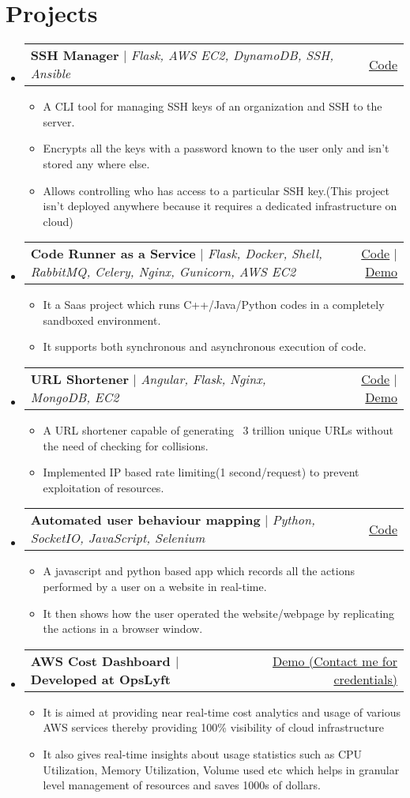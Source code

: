 \documentclass[letterpaper,11pt]{article}
\makeatletter
\newcommand{\resumeItem}[1]{
  \item\small{
    {#1 \vspace{-2pt}}
  }
}
\newcommand{\resumeProjectHeading}[2]{
    \item
    \begin{tabular*}{0.97\textwidth}{l@{\extracolsep{\fill}}r}
      \small#1 & #2 \\
    \end{tabular*}\vspace{-7pt}
}
\newcommand{\resumeSubHeadingListStart}{\begin{itemize}[leftmargin=0.15in, label={}]}
\newcommand{\resumeSubHeadingListEnd}{\end{itemize}}
\newcommand{\resumeItemListStart}{\begin{itemize}}
\newcommand{\resumeItemListEnd}{\end{itemize}\vspace{-5pt}}
\makeatother
\begin{document}
\section{Projects}
    \resumeSubHeadingListStart
      \resumeProjectHeading
          {\textbf{SSH Manager} $|$ \emph{Flask, AWS EC2, DynamoDB, SSH, Ansible}}{\href{https://github.com/kartikbehl99/ssh-manager-backend}{Code}}
          \resumeItemListStart
            \resumeItem{A CLI tool for managing SSH keys of an organization and SSH to the server.}
            \resumeItem{Encrypts all the keys with a password known to the user only and isn’t stored any where else.}
            \resumeItem{Allows controlling who has access to a particular SSH key.(This project isn't deployed anywhere because it requires a dedicated infrastructure on cloud)}
          \resumeItemListEnd
      \resumeProjectHeading
          {\textbf{Code Runner as a Service} $|$ \emph{Flask, Docker, Shell, RabbitMQ, Celery, Nginx, Gunicorn, AWS EC2}}{\href{https://github.com/thephilomaths/code-runner-as-a-service}{Code} $|$ \href{https://www.postman.com/kartikbehl99/workspace/code-runner-workspace/overview}{Demo}}
          \resumeItemListStart
            \resumeItem{It a Saas project which runs C++/Java/Python codes in a completely sandboxed environment.}
            \resumeItem{It supports both synchronous and asynchronous execution of code.}
         \resumeItemListEnd
      \resumeProjectHeading
          {\textbf{URL Shortener} $|$ \emph{Angular, Flask, Nginx, MongoDB, EC2}}{\href{https://github.com/kartikbehl99/URL-shortener-public}{Code} $|$ \href{https://smol.ga}{Demo}}
          \resumeItemListStart
            \resumeItem{A URL shortener capable of generating ~3 trillion unique URLs without the need of checking for collisions.}
          \resumeItem{Implemented IP based rate limiting(1 second/request) to prevent exploitation of resources.}
          \resumeItemListEnd
      \resumeProjectHeading
          {\textbf{Automated user behaviour mapping} $|$ \emph{Python, SocketIO, JavaScript, Selenium}}{\href{https://github.com/kartikbehl99/automated-user-behaviour-mapping}{Code}}
          \resumeItemListStart
            \resumeItem{A javascript and python based app which records all the actions performed by a user on a website in real-time.}
            \resumeItem{It then shows how the user operated the website/webpage by replicating the actions in a browser window.}
          \resumeItemListEnd
      \resumeProjectHeading
          {\textbf{AWS Cost Dashboard $|$ Developed at OpsLyft}}{\href{https://grafana.opslyft.com}{Demo (Contact me for credentials)}}
          \resumeItemListStart
            \resumeItem{It is aimed at providing near real-time cost analytics and usage of various AWS services thereby providing 100\% visibility of cloud infrastructure}
            \resumeItem{It also gives real-time insights about usage statistics such as CPU Utilization, Memory Utilization, Volume used etc which helps in granular level management of resources and saves 1000s of dollars.}
         \resumeItemListEnd
    \resumeSubHeadingListEnd
\end{document}

